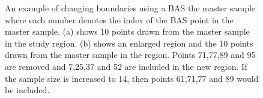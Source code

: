 \documentclass[titlepage]{article}
\begin{document}
\newpage

\begin{figure}[H]
	\centering
	\hfill
	\caption{An example of changing boundaries using a BAS the master sample where each number denotes the index of the BAS point in the master sample. (a) shows 10 points drawn from the master sample in the study region. (b) shows an enlarged region and the 10 points drawn from the master sample in the region. Points 71,77,89 and 95 are removed and 7,25,37 and 52 are included in the new region. If the sample size is increased to 14, then points 61,71,77 and 89 would be included.}\label{CB}
\end{figure}

\newpage
\end{document}
